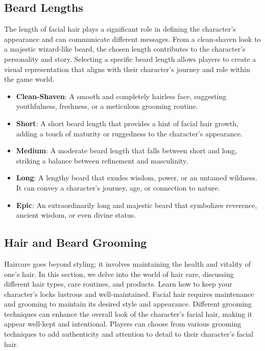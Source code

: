 \subsection{\textbf{Beard Lengths}}

The length of facial hair plays a significant role in defining the character's appearance and can communicate different messages. From a clean-shaven look to a majestic wizard-like beard, the chosen length contributes to the character's personality and story. Selecting a specific beard length allows players to create a visual representation that aligns with their character's journey and role within the game world.

\begin{itemize}
    \item \textbf{Clean-Shaven}: A smooth and completely hairless face, suggesting youthfulness, freshness, or a meticulous grooming routine.
    \item \textbf{Short}: A short beard length that provides a hint of facial hair growth, adding a touch of maturity or ruggedness to the character's appearance.
    \item \textbf{Medium}: A moderate beard length that falls between short and long, striking a balance between refinement and masculinity.
    \item \textbf{Long}: A lengthy beard that exudes wisdom, power, or an untamed wildness. It can convey a character's journey, age, or connection to nature.
    \item \textbf{Epic}: An extraordinarily long and majestic beard that symbolizes reverence, ancient wisdom, or even divine status.
\end{itemize}

\subsection{\textbf{Hair and Beard Grooming}}

Haircare goes beyond styling; it involves maintaining the health and vitality of one's hair. In this section, we delve into the world of hair care, discussing different hair types, care routines, and products. Learn how to keep your character's locks lustrous and well-maintained. Facial hair requires maintenance and grooming to maintain its desired style and appearance. Different grooming techniques can enhance the overall look of the character's facial hair, making it appear well-kept and intentional. Players can choose from various grooming techniques to add authenticity and attention to detail to their character's facial hair.

